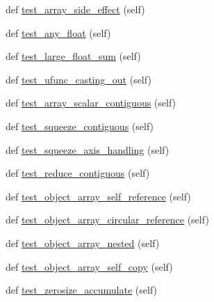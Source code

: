 \begin{DoxyCompactItemize}
def \hyperlink{classnumpy_1_1core_1_1tests_1_1test__regression_1_1TestRegression_a7bfd6615938008ddd4ffe736a4a991cd}{test\+\_\+array\+\_\+side\+\_\+effect} (self)
\item 
def \hyperlink{classnumpy_1_1core_1_1tests_1_1test__regression_1_1TestRegression_a603beda0da3689305e0b9571f9bfbc22}{test\+\_\+any\+\_\+float} (self)
\item 
def \hyperlink{classnumpy_1_1core_1_1tests_1_1test__regression_1_1TestRegression_ae97fd67f322ac38ed253789dd4ed8d3d}{test\+\_\+large\+\_\+float\+\_\+sum} (self)
\item 
def \hyperlink{classnumpy_1_1core_1_1tests_1_1test__regression_1_1TestRegression_a1f13bf21ec15fd8bd2a65630a56f600b}{test\+\_\+ufunc\+\_\+casting\+\_\+out} (self)
\item 
def \hyperlink{classnumpy_1_1core_1_1tests_1_1test__regression_1_1TestRegression_a0a8a807600cfa341a9e16088a290e932}{test\+\_\+array\+\_\+scalar\+\_\+contiguous} (self)
\item 
def \hyperlink{classnumpy_1_1core_1_1tests_1_1test__regression_1_1TestRegression_ad3ce077bf4e94cf8f62fa4375c7c0bd3}{test\+\_\+squeeze\+\_\+contiguous} (self)
\item 
def \hyperlink{classnumpy_1_1core_1_1tests_1_1test__regression_1_1TestRegression_a460af015a737a4dcec46fb0b3b1c93ad}{test\+\_\+squeeze\+\_\+axis\+\_\+handling} (self)
\item 
def \hyperlink{classnumpy_1_1core_1_1tests_1_1test__regression_1_1TestRegression_af87b6728a064b43a92e6c88f8199a570}{test\+\_\+reduce\+\_\+contiguous} (self)
\item 
def \hyperlink{classnumpy_1_1core_1_1tests_1_1test__regression_1_1TestRegression_a38be554d2a29eb42ba18b4fd5e930939}{test\+\_\+object\+\_\+array\+\_\+self\+\_\+reference} (self)
\item 
def \hyperlink{classnumpy_1_1core_1_1tests_1_1test__regression_1_1TestRegression_a65992ca7c7893dde7034fc40f75fbb72}{test\+\_\+object\+\_\+array\+\_\+circular\+\_\+reference} (self)
\item 
def \hyperlink{classnumpy_1_1core_1_1tests_1_1test__regression_1_1TestRegression_a2cc61a69fd3f99429c5d2098f89ea844}{test\+\_\+object\+\_\+array\+\_\+nested} (self)
\item 
def \hyperlink{classnumpy_1_1core_1_1tests_1_1test__regression_1_1TestRegression_a5d25fb3d1b934beb3b1cfb3fff274094}{test\+\_\+object\+\_\+array\+\_\+self\+\_\+copy} (self)
\item 
def \hyperlink{classnumpy_1_1core_1_1tests_1_1test__regression_1_1TestRegression_ab0ba2bca044c526d598bc2ba5a251548}{test\+\_\+zerosize\+\_\+accumulate} (self)

\end{DoxyCompactItemize}
